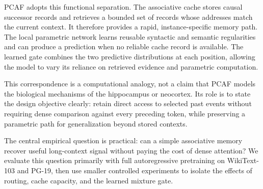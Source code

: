 \documentclass{article}
\begin{document}
PCAF adopts this functional separation. The associative cache stores causal
successor records and retrieves a bounded set of records whose addresses match
the current context. It therefore provides a rapid, instance-specific memory
path. The local parametric network learns reusable syntactic and semantic
regularities and can produce a prediction when no reliable cache record is
available. The learned gate combines the two predictive distributions at each
position, allowing the model to vary its reliance on retrieved evidence and
parametric computation.

This correspondence is a computational analogy, not a claim that PCAF models
the biological mechanisms of the hippocampus or neocortex. Its role is to state
the design objective clearly: retain direct access to selected past events
without requiring dense comparison against every preceding token, while
preserving a parametric path for generalization beyond stored contexts.

The central empirical question is practical: can a simple associative memory
recover useful long-context signal without paying the cost of dense attention?
We evaluate this question primarily with full autoregressive pretraining on
WikiText-103 and PG-19, then use smaller controlled experiments to isolate
the effects of routing, cache capacity, and the learned mixture gate.
\end{document}
